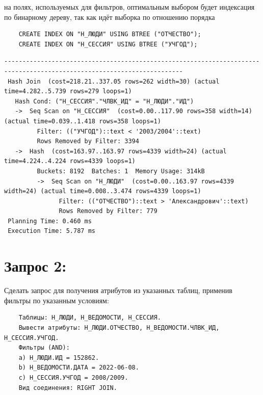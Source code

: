 на полях, используемых для фильтров, оптимальным выбором будет индексация по бинарному дереву, так как идёт выборка по отношению порядка
\begin{verbatim}
    CREATE INDEX ON "Н_ЛЮДИ" USING BTREE ("ОТЧЕСТВО");
    CREATE INDEX ON "Н_СЕССИЯ" USING BTREE ("УЧГОД");
\end{verbatim}

\tiny
\begin{verbatim}
-----------------------------------------------------------------------------------------------------------------------
 Hash Join  (cost=218.21..337.05 rows=262 width=30) (actual time=4.282..5.739 rows=279 loops=1)
   Hash Cond: ("Н_СЕССИЯ"."ЧЛВК_ИД" = "Н_ЛЮДИ"."ИД")
   ->  Seq Scan on "Н_СЕССИЯ"  (cost=0.00..117.90 rows=358 width=14) (actual time=0.039..1.418 rows=358 loops=1)
         Filter: (("УЧГОД")::text < '2003/2004'::text)
         Rows Removed by Filter: 3394
   ->  Hash  (cost=163.97..163.97 rows=4339 width=24) (actual time=4.224..4.224 rows=4339 loops=1)
         Buckets: 8192  Batches: 1  Memory Usage: 314kB
         ->  Seq Scan on "Н_ЛЮДИ"  (cost=0.00..163.97 rows=4339 width=24) (actual time=0.008..3.474 rows=4339 loops=1)
               Filter: (("ОТЧЕСТВО")::text > 'Александрович'::text)
               Rows Removed by Filter: 779
 Planning Time: 0.460 ms
 Execution Time: 5.787 ms
\end{verbatim}

\normalsize

\section{Запрос 2:}
Сделать запрос для получения атрибутов из указанных таблиц, применив фильтры по указанным условиям:
\begin{verbatim}
    Таблицы: Н_ЛЮДИ, Н_ВЕДОМОСТИ, Н_СЕССИЯ.
    Вывести атрибуты: Н_ЛЮДИ.ОТЧЕСТВО, Н_ВЕДОМОСТИ.ЧЛВК_ИД, Н_СЕССИЯ.УЧГОД.
    Фильтры (AND):
    a) Н_ЛЮДИ.ИД = 152862.
    b) Н_ВЕДОМОСТИ.ДАТА = 2022-06-08.
    c) Н_СЕССИЯ.УЧГОД = 2008/2009.
    Вид соединения: RIGHT JOIN.
\end{verbatim}


